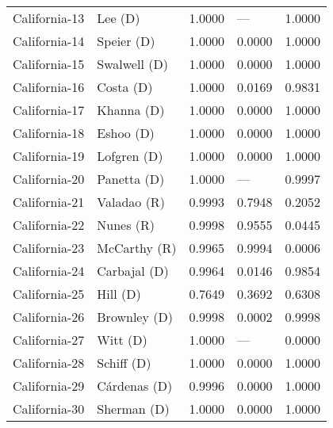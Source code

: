 \begin{longtable}{llrll}
     California-13 &             {\color{Blue} Lee (D)} &       1.0000 &           --- &        1.0000 \\
     California-14 &          {\color{Blue} Speier (D)} &       1.0000 &        0.0000 &        1.0000 \\
     California-15 &        {\color{Blue} Swalwell (D)} &       1.0000 &        0.0000 &        1.0000 \\
     California-16 &           {\color{Blue} Costa (D)} &       1.0000 &        0.0169 &        0.9831 \\
     California-17 &          {\color{Blue} Khanna (D)} &       1.0000 &        0.0000 &        1.0000 \\
     California-18 &           {\color{Blue} Eshoo (D)} &       1.0000 &        0.0000 &        1.0000 \\
     California-19 &         {\color{Blue} Lofgren (D)} &       1.0000 &        0.0000 &        1.0000 \\
     California-20 &         {\color{Blue} Panetta (D)} &       1.0000 &           --- &        0.9997 \\
     California-21 &          {\color{Red} Valadao (R)} &       0.9993 &        0.7948 &        0.2052 \\
     California-22 &            {\color{Red} Nunes (R)} &       0.9998 &        0.9555 &        0.0445 \\
     California-23 &         {\color{Red} McCarthy (R)} &       0.9965 &        0.9994 &        0.0006 \\
     California-24 &        {\color{Blue} Carbajal (D)} &       0.9964 &        0.0146 &        0.9854 \\
     California-25 &            {\color{Blue} Hill (D)} &       0.7649 &        0.3692 &        0.6308 \\
     California-26 &        {\color{Blue} Brownley (D)} &       0.9998 &        0.0002 &        0.9998 \\
     California-27 &            {\color{Blue} Witt (D)} &       1.0000 &           --- &        0.0000 \\
     California-28 &          {\color{Blue} Schiff (D)} &       1.0000 &        0.0000 &        1.0000 \\
     California-29 &        {\color{Blue} Cárdenas (D)} &       0.9996 &        0.0000 &        1.0000 \\
     California-30 &         {\color{Blue} Sherman (D)} &       1.0000 &        0.0000 &        1.0000 \\

\end{longtable}
